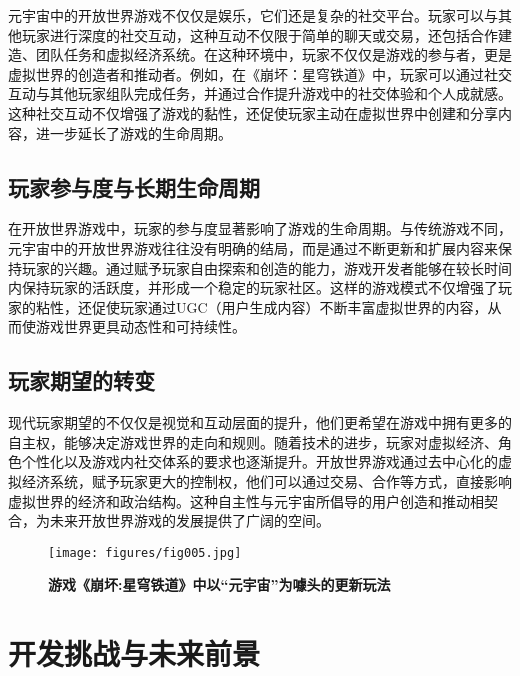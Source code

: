 \documentclass[UTF8]{ctexart}
\begin{document}
	元宇宙中的开放世界游戏不仅仅是娱乐，它们还是复杂的社交平台。玩家可以与其他玩家进行深度的社交互动，这种互动不仅限于简单的聊天或交易，还包括合作建造、团队任务和虚拟经济系统\cite{silva2022gamerneeds}。在这种环境中，玩家不仅仅是游戏的参与者，更是虚拟世界的创造者和推动者。例如，在《崩坏：星穹铁道》中，玩家可以通过社交互动与其他玩家组队完成任务，并通过合作提升游戏中的社交体验和个人成就感。这种社交互动不仅增强了游戏的黏性，还促使玩家主动在虚拟世界中创建和分享内容，进一步延长了游戏的生命周期。
	
	\subsection{玩家参与度与长期生命周期}
	
	在开放世界游戏中，玩家的参与度显著影响了游戏的生命周期。与传统游戏不同，元宇宙中的开放世界游戏往往没有明确的结局，而是通过不断更新和扩展内容来保持玩家的兴趣\cite{cavus2021userexperience}。通过赋予玩家自由探索和创造的能力，游戏开发者能够在较长时间内保持玩家的活跃度，并形成一个稳定的玩家社区。这样的游戏模式不仅增强了玩家的粘性，还促使玩家通过UGC（用户生成内容）不断丰富虚拟世界的内容，从而使游戏世界更具动态性和可持续性。
	
	\subsection{玩家期望的转变}
	
	现代玩家期望的不仅仅是视觉和互动层面的提升，他们更希望在游戏中拥有更多的自主权，能够决定游戏世界的走向和规则\cite{park2021metaverse}。随着技术的进步，玩家对虚拟经济、角色个性化以及游戏内社交体系的要求也逐渐提升。开放世界游戏通过去中心化的虚拟经济系统，赋予玩家更大的控制权，他们可以通过交易、合作等方式，直接影响虚拟世界的经济和政治结构。这种自主性与元宇宙所倡导的用户创造和推动相契合，为未来开放世界游戏的发展提供了广阔的空间。
	
	\begin{figure}[htbp] %
		\centering %
		\texttt{[image: figures/fig005.jpg]} %
		\caption{\textbf{游戏《崩坏:星穹铁道》中以“元宇宙”为噱头的更新玩法}} %
		\label{fig:5} %
	\end{figure}
	
	
	\section{开发挑战与未来前景}
	
\end{document}
